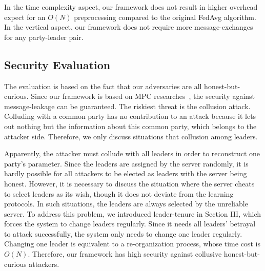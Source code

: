 In the time complexity aspect, our framework does not result in higher overhead expect for an $O(N)$ preprocessing compared to the original FedAvg algorithm. In the vertical aspect, our framework does not require more message-exchanges for any party-leader pair. 

\subsection{Security Evaluation}
The evaluation is based on the fact that our adversaries are all honest-but-curious. Since our framework is based on MPC researches~\cite{Shamir,Du2001SecureMC,Three-Party}, the security against message-leakage can be guaranteed. The riskiest threat is the collusion attack. Colluding with a common party has no contribution to an attack because it lets out nothing but the information about this common party, which belongs to the attacker side. Therefore, we only discuss situations that collusion among leaders. 

Apparently, the attacker must collude with all leaders in order to reconstruct one party's parameter. Since the leaders are assigned by the server randomly, it is hardly possible for all attackers to be elected as leaders with the server being honest. However, it is necessary to discuss the situation where the server cheats to select leaders as its wish, though it does not deviate from the learning protocols. In such situations, the leaders are always selected by the unreliable server. To address this problem, we introduced leader-tenure in Section III, which forces the system to change leaders regularly. Since it needs all leaders' betrayal to attack successfully, the system only needs to change one leader regularly. Changing one leader is equivalent to a re-organization process, whose time cost is $O(N)$. Therefore, our framework has high security against collusive honest-but-curious attackers.
